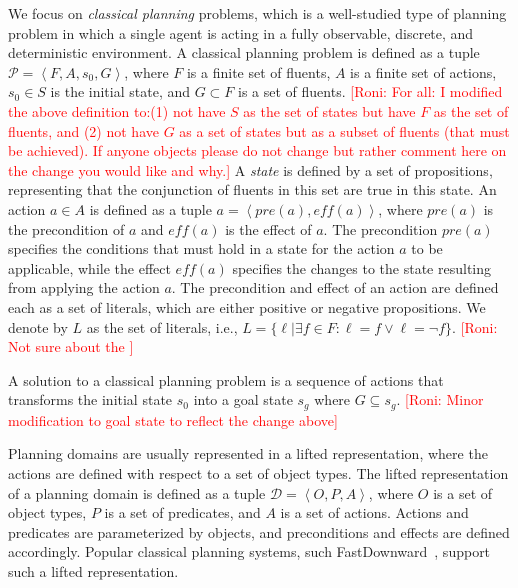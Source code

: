 \documentclass{article}
\theoremstyle{definition}
\theoremstyle{remark}
\newcommand{\tuple}[1]{\ensuremath{\left \langle #1 \right \rangle }}
\newcommand{\roni}[1]{{\textcolor{red}{[Roni: #1]}}}
\begin{document}
We focus on \emph{classical planning} problems, which is a well-studied type of planning problem in which a single agent is acting in a fully observable, discrete, and deterministic environment. 
A classical planning problem is defined as a tuple $\mathcal{P} = \tuple{F, A, s_0, G}$, where $F$ is a finite set of fluents, $A$ is a finite set of actions, $s_0 \in S$ is the initial state, and $G\subset F$ is a set of fluents. \roni{For all: I modified the above definition to:(1) not have $S$ as the set of states but have $F$ as the set of fluents, and (2) not have $G$ as a set of states but as a subset of fluents (that must be achieved). If anyone objects please do not change but rather comment here on the change you would like and why.}
A \emph{state} is defined by a set of propositions, representing that the conjunction of fluents in this set are true in this state.
An action $a\in A$ is defined as a tuple $a = \tuple{\mathit{pre}(a), \mathit{eff}(a)}$, where $\mathit{pre}(a)$ is the precondition of $a$ and $\mathit{eff}(a)$ is the effect of $a$. 
The precondition $\mathit{pre}(a)$ specifies the conditions that must hold in a state for the action $a$ to be applicable, while the effect $\mathit{eff}(a)$ specifies the changes to the state resulting from applying the action $a$.   
The precondition and effect of an action are defined each as a set of literals, which are either positive or negative propositions. We denote by $L$ as the set of literals, i.e., $L=\{\ell | \exists f\in F: \ell=f \vee \ell=\neg f\}$. \roni{Not sure about the }

A solution to a classical planning problem is a sequence of actions that transforms the initial state $s_0$ into a goal state $s_g$ where $G\subseteq s_g$. \roni{Minor modification to goal state to reflect the change above}


Planning domains are usually represented in a lifted representation, where the actions are defined with respect to a set of object types.
The lifted representation of a planning domain is defined as a tuple $\mathcal{D} = \tuple{O, P, A}$, where $O$ is a set of object types, $P$ is a set of predicates, and $A$ is a set of actions. Actions and predicates are parameterized by objects, and preconditions and effects are defined accordingly. 
Popular classical planning systems, such FastDownward~\citep{helmert2006fast}, support such a lifted representation. 
\end{document}
